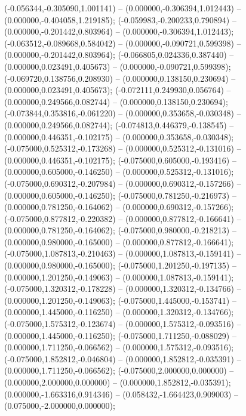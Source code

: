  (-0.056344,-0.305090,1.001141) -- (0.000000,-0.306394,1.012443) -- (0.000000,-0.404058,1.219185);
 (-0.059983,-0.200233,0.790894) -- (0.000000,-0.201442,0.803964) -- (0.000000,-0.306394,1.012443);
 (-0.063512,-0.089668,0.584042) -- (0.000000,-0.090721,0.599398) -- (0.000000,-0.201442,0.803964);
 (-0.066805,0.024336,0.387440) -- (0.000000,0.023491,0.405673) -- (0.000000,-0.090721,0.599398);
 (-0.069720,0.138756,0.208930) -- (0.000000,0.138150,0.230694) -- (0.000000,0.023491,0.405673);
 (-0.072111,0.249930,0.056764) -- (0.000000,0.249566,0.082744) -- (0.000000,0.138150,0.230694);
 (-0.073844,0.353816,-0.061220) -- (0.000000,0.353658,-0.030348) -- (0.000000,0.249566,0.082744);
 (-0.074813,0.446379,-0.138545) -- (0.000000,0.446351,-0.102175) -- (0.000000,0.353658,-0.030348);
 (-0.075000,0.525312,-0.173268) -- (0.000000,0.525312,-0.131016) -- (0.000000,0.446351,-0.102175);
 (-0.075000,0.605000,-0.193416) -- (0.000000,0.605000,-0.146250) -- (0.000000,0.525312,-0.131016);
 (-0.075000,0.690312,-0.207984) -- (0.000000,0.690312,-0.157266) -- (0.000000,0.605000,-0.146250);
 (-0.075000,0.781250,-0.216973) -- (0.000000,0.781250,-0.164062) -- (0.000000,0.690312,-0.157266);
 (-0.075000,0.877812,-0.220382) -- (0.000000,0.877812,-0.166641) -- (0.000000,0.781250,-0.164062);
 (-0.075000,0.980000,-0.218213) -- (0.000000,0.980000,-0.165000) -- (0.000000,0.877812,-0.166641);
 (-0.075000,1.087813,-0.210463) -- (0.000000,1.087813,-0.159141) -- (0.000000,0.980000,-0.165000);
 (-0.075000,1.201250,-0.197135) -- (0.000000,1.201250,-0.149063) -- (0.000000,1.087813,-0.159141);
 (-0.075000,1.320312,-0.178228) -- (0.000000,1.320312,-0.134766) -- (0.000000,1.201250,-0.149063);
 (-0.075000,1.445000,-0.153741) -- (0.000000,1.445000,-0.116250) -- (0.000000,1.320312,-0.134766);
 (-0.075000,1.575312,-0.123674) -- (0.000000,1.575312,-0.093516) -- (0.000000,1.445000,-0.116250);
 (-0.075000,1.711250,-0.088029) -- (0.000000,1.711250,-0.066562) -- (0.000000,1.575312,-0.093516);
 (-0.075000,1.852812,-0.046804) -- (0.000000,1.852812,-0.035391) -- (0.000000,1.711250,-0.066562);
 (-0.075000,2.000000,0.000000) -- (0.000000,2.000000,0.000000) -- (0.000000,1.852812,-0.035391);
 (0.000000,-1.663316,0.914346) -- (0.058432,-1.664423,0.909003) -- (0.075000,-2.000000,0.000000);
